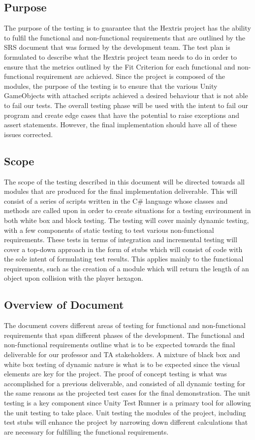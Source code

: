 \documentclass[12pt, titlepage]{article}
\begin{document}
\subsection{Purpose}
The purpose of the testing is to guarantee that the Hextris project has the ability to fulfil the functional and non-functional requirements that are outlined by the SRS document that was formed by the development team. The test plan is formulated to describe what the Hextris project team needs to do in order to ensure that the metrics outlined by the Fit Criterion for each functional and non-functional requirement are achieved. Since the project is composed of the modules, the purpose of the testing is to ensure that the various Unity GameObjects with attached scripts achieved a desired behaviour that is not able to fail our tests. The overall testing phase will be used with the intent to fail our program and create edge cases that have the potential to raise exceptions and assert statements. However, the final implementation should have all of these issues corrected. 

\subsection{Scope}
The scope of the testing described in this document will be directed towards all modules that are produced for the final implementation deliverable. This will consist of a series of scripts written in the C\# language whose classes and methods are called upon in order to create situations for a testing environment in both white box and block testing.  The testing will cover mainly dynamic testing, with a few components of static testing to test various non-functional requirements. These tests in terms of integration and incremental testing will cover a top-down approach in the form of stubs which will consist of code with the sole intent of formulating test results. This applies mainly to the functional requirements, such as the creation of a module which will return the length of an object upon collision with the player hexagon. 

\subsection{Overview of Document}
The document covers different areas of testing for functional and non-functional requirements that span different phases of the development. The functional and non-functional requirements outline what is to be expected towards the final deliverable for our professor and TA stakeholders. A mixture of black box and white box testing of dynamic nature is what is to be expected since the visual elements are key for the project. The proof of concept testing is what was accomplished for a previous deliverable, and consisted of all dynamic testing for the same reasons as the projected test cases for the final demonstration. The unit testing is a key component since Unity Test Runner is a primary tool for allowing the unit testing to take place. Unit testing the modules of the project, including test stubs will enhance the project by narrowing down different calculations that are necessary for fulfilling the functional requirements. 
\end{document}
